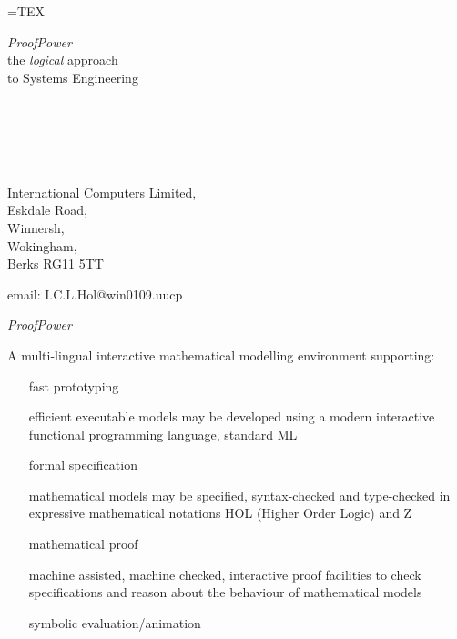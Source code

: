 =TEX
\begin{slide}{}
\begin{center}
{{\LARGE\it ProofPower}\\
the {\it logical} approach\\
to Systems Engineering}

\ \\
\ \\
\ \\
\ \\

{\tiny International Computers Limited,\\
Eskdale Road,\\
Winnersh,\\
Wokingham,\\
Berks RG11 5TT

email: I.C.L.Hol@win0109.uucp}
\end{center}
\end{slide}

\begin{slide}{}
\begin{center}
{\LARGE \it ProofPower}

A multi-lingual interactive mathematical modelling environment supporting:
\end{center}

\begin{itemize}
\item[fast prototyping]\ 

efficient executable models may be developed using a modern interactive functional programming language, standard ML

\item[formal specification]\ 

mathematical models may be specified, syntax-checked and type-checked in expressive mathematical notations HOL (Higher Order Logic) and Z

\item[mathematical proof]\ 

machine assisted, machine checked, interactive proof facilities to check specifications and reason about the behaviour of mathematical models

\item[symbolic evaluation/animation]\ 

\end{itemize}

\end{slide}

